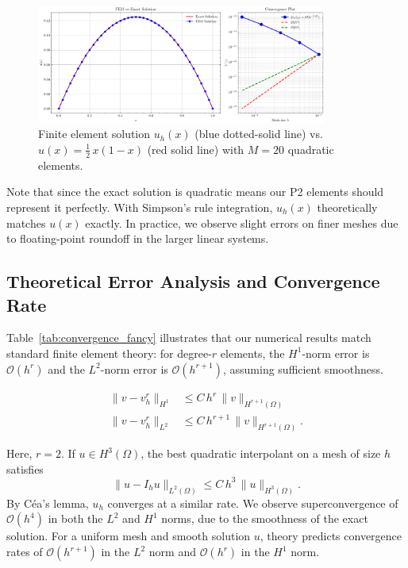 \documentclass[a4paper,10pt]{article}
\begin{document}
\begin{figure}[H]
	\centering
	\includegraphics[width=0.85\textwidth]{figures/fem_plot_convergence_simple_M20.png}
	\caption{Finite element solution \(u_h(x)\) (blue dotted-solid line) vs.\
		\(u(x)=\tfrac12\,x(1-x)\) (red solid line) with \(M=20\) quadratic elements.}
	\label{fig:solution_simple}
\end{figure}

\medskip

Note that since the exact solution is quadratic means our P2 elements should represent it perfectly.
With Simpson's rule integration, $u_h(x)$ theoretically matches $u(x)$ exactly.
In practice, we observe slight errors on finer meshes due to floating-point roundoff in the larger linear systems.


\subsection{Theoretical Error Analysis and Convergence Rate}
Table~\ref{tab:convergence_fancy} illustrates that our numerical results match
standard finite element theory: for degree-$r$ elements, the $H^1$-norm error is
$\mathcal{O}(h^r)$ and the $L^2$-norm error is $\mathcal{O}(h^{r+1})$, assuming
sufficient smoothness.

\begin{align*}
	\|v - v_h^r\|_{H^1} & \le C\,h^{r}\,\|v\|_{H^{r+1}(\Omega)} \\
	\|v - v_h^r\|_{L^2} & \le C\,h^{r+1}\,\|v\|_{H^{r+1}(\Omega)}.
\end{align*}

Here, $r=2$. If $u \in H^3(\Omega)$, the best quadratic interpolant on a mesh
of size $h$ satisfies
\[
	\|u - I_h u\|_{L^2(\Omega)} \le C\,h^{3}\,\|u\|_{H^3(\Omega)}.
\]
By Céa's lemma, $u_h$ converges at a similar rate\cite{Curry2018}.
We observe superconvergence of $\mathcal{O}(h^4)$ in both the $L^2$ and $H^1$ norms, due to the smoothness of the exact solution. 
For a uniform mesh and smooth solution $u$, theory predicts convergence rates of $\mathcal{O}(h^{r+1})$ in the $L^2$ norm and $\mathcal{O}(h^r)$ in the $H^1$ norm.
\end{document}
